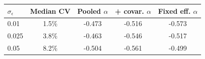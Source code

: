\begin{tabular}{lcccc}\toprule $\sigma_\epsilon$ & Median CV & Pooled $\alpha$ & + covar. $\alpha$ & Fixed eff. $\alpha$\\\midrule
0.01 & 1.5\% & -0.473 & -0.516 & -0.573\\
0.025 & 3.8\% & -0.463 & -0.546 & -0.517\\
0.05 & 8.2\% & -0.504 & -0.561 & -0.499\\
\bottomrule\end{tabular}